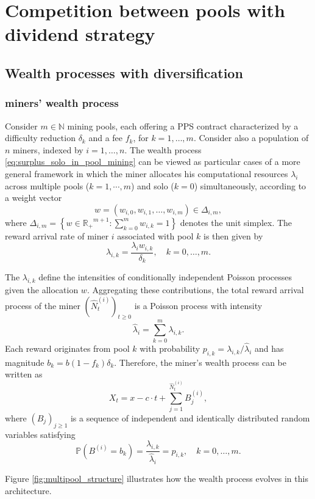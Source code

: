 \section{Competition between pools with dividend strategy}

\subsection{Wealth processes with diversification}
\subsubsection{miners' wealth process}

Consider $m \in \mathbb{N}$ mining pools, each offering a PPS contract characterized by a difficulty reduction $\delta_k$ and a fee $f_k$, for $k = 1, \dots, m$. Consider also a population of $n$ miners, indexed by $i = 1, \dots, n$. The wealth process \eqref{eq:surplus_solo_in_pool_mining} can be viewed as particular cases of a more general framework in which the miner allocates his computational resources $\lambda_i$ across multiple pools ($k = 1,\cdots,m$) and solo ($k=0$) simultaneously, according to a weight vector
\[
w = (w_{i,0}, w_{i,1}, \dots, w_{i,m}) \in \Delta_{i,m},
\]
where $\Delta_{i,m} = \left\{ w \in \mathbb{R_+}^{m+1} : \sum_{k=0}^m w_{i,k} = 1 \right\}$ denotes the unit simplex. The reward arrival rate of miner $i$ associated with pool $k$ is then given by
\[
\lambda_{i,k} = \frac{\lambda_i w_{i,k}}{\delta_k}, \quad k = 0, \dots, m.
\]

The $\lambda_{i,k}$ define the intensities of conditionally independent Poisson processes given the allocation $w$. Aggregating these contributions, the total reward arrival process of the miner $(\hat{N}^{(i)}_t)_{t \geq 0}$ is a Poisson process with intensity
\[
\hat{\lambda}_i = \sum_{k=0}^m \lambda_{i,k}.
\]
Each reward originates from pool $k$ with probability $p_{i,k} = \lambda_{i,k} / \hat{\lambda} _i$ and has magnitude $b_k = b(1-f_k)\delta_k$. Therefore, the miner’s wealth process can be written as
\begin{equation}\label{welath_multi_miner}
X_t = x - c \cdot t + \sum_{j=1}^{\hat{N}^{(i)}_t} B^{(i)}_j,
\end{equation}
where $(B_j)_{j \geq 1}$ is a sequence of independent and identically distributed random variables satisfying
\[
\mathbb{P}(B^{(i)} = b_k) = \frac{\lambda_{i,k}} {\hat{\lambda}_i} = p_{i,k}, \quad k = 0, \dots, m.
\]

Figure \ref{fig:multipool_structure} illustrates how the wealth process evolves in this architecture.

